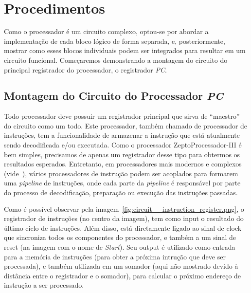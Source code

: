 \documentclass[12pt]{article}
\begin{document}
\section{Procedimentos}\label{sec:Procedimentos}

Como o processador é um circuito complexo, optou-se por abordar a implementação
de cada bloco lógico de forma separada, e, posteriormente, mostrar como esses
blocos individuais podem ser integrados para resultar em um circuito funcional.
Começaremos demonstrando a montagem do circuito do principal registrador do
processador, o registrador \emph{PC}.

\subsection{Montagem do Circuito do Processador \emph{PC}}\label{sec:2.1}

Todo processador deve possuir um registrador principal que sirva de ``maestro''
do circuito como um todo. Este processador, também chamado de processador de
instruções, tem a funcionalidade de armazenar a instrução que está atualmente
sendo decodificada e/ou executada. Como o processador ZeptoProcessador-III é bem
simples, precisamos de apenas um registrador desse tipo para obtermos os
resultados esperados. Entretanto, em processadores mais modernos e complexos
(vide~\cite{Instruction_register}), vários processadores de instrução podem ser
acoplados para formarem uma \emph{pipeline} de instruções, onde cada parte da
\emph{pipeline} é responsável por parte do processo de decodificação, preparação
ou execução das instruções passadas.

Como é possível observar pela
imagem~\ref{fig:circuit__instruction_register.png}, o registrador de instruções
(no centro da imagem), tem como input o resultado do último ciclo de instruções.
Além disso, está diretamente ligado ao sinal de clock que sincroniza todos os
componentes do processador, e também a um sinal de reset (na imagem com o nome
de \emph{Start}). Seu output é utilizado como entrada para a memória de
instruções (para obter a próxima intrução que deve ser processada), e também
utilizada em um somador (aqui não mostrado devido à distância entre o
registrador e o somador), para calcular o próximo endereço de instrução a ser
processado.
\end{document}

